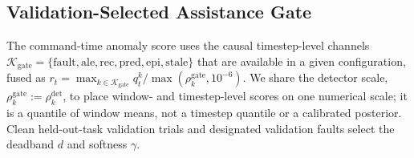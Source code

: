 \documentclass[letterpaper]{article} %
\begin{document}
\subsection{Validation-Selected Assistance Gate}

The command-time anomaly score uses the causal timestep-level channels
$\mathcal{K}_{\mathrm{gate}}=\{\mathrm{fault},\mathrm{ale},\mathrm{rec},\mathrm{pred},\mathrm{epi},\mathrm{stale}\}$ that are available in a given configuration, fused as $r_t=\max_{k\in\mathcal{K}_{\mathrm{gate}}}q_t^k/\max(\rho_k^{\mathrm{gate}},10^{-6})$.
We share the detector scale, $\rho_k^{\mathrm{gate}}:=\rho_k^{\mathrm{det}}$, to place window- and timestep-level scores on one numerical scale; it is a quantile of window means, not a timestep quantile or a calibrated posterior. Clean held-out-task validation trials and designated validation faults select the deadband $d$ and softness $\gamma$.
\end{document}
